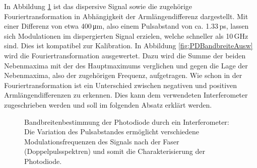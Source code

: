 \documentclass[bachelor,       %
               twoside,        %
               BCOR10mm,       %
               liststotoc,nomtotoc,bibtotoc, %
               english,ngerman, %
               final,          %
               ]{GAUBM}
\begin{document}
In Abbildung \ref{fig:PDBandbreite} ist das dispersive Signal sowie die zugehörige Fouriertransformation in Abhängigkeit der Armlängendifferenz dargestellt.
Mit einer Differenz von etwa 400\,\si{\micro\meter}, also einem Pulsabstand von ca. 1.33\,ps, lassen sich Modulationen im dispergierten Signal erzielen, welche schneller als 10\,GHz sind.
Dies ist kompatibel zur Kalibration.
In Abbildung \ref{fig:PDBandbreiteAusw} wird die Fouriertransformation ausgewertet.
Dazu wird die Summe der beiden Nebenmaxima mit der des Hauptmaximums verglichen und gegen die Lage der Nebenmaxima, also der zugehörigen Frequenz, aufgetragen.
Wie schon in der Fouriertransformation ist ein Unterschied zwischen negativen und positiven Armlängendifferenzen zu erkennen.
Dies kann dem verwendeten Interferometer zugeschrieben werden und soll im folgenden Absatz erklärt werden.
\begin{figure}[!htb]
   \centering
   \hfill
   \caption{Bandbreitenbestimmung der Photodiode durch ein Interferometer: Die Variation des Pulsabstandes ermöglicht verschiedene Modulationsfrequenzen des Signals nach der Faser (Doppelpulsspektren) und somit die Charakterisierung der Photodiode.}
   \label{fig:PDBandbreite}
\end{figure}
\end{document}

